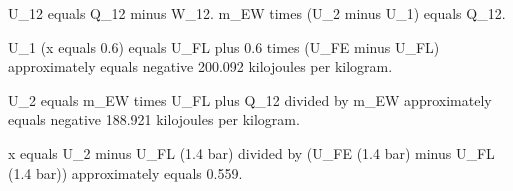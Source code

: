 U_12 equals Q_12 minus W_12.  
m_EW times (U_2 minus U_1) equals Q_12.  

U_1 (x equals 0.6) equals U_FL plus 0.6 times (U_FE minus U_FL) approximately equals negative 200.092 kilojoules per kilogram.  

U_2 equals m_EW times U_FL plus Q_12 divided by m_EW approximately equals negative 188.921 kilojoules per kilogram.  

x equals U_2 minus U_FL (1.4 bar) divided by (U_FE (1.4 bar) minus U_FL (1.4 bar)) approximately equals 0.559.